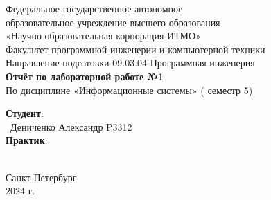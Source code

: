 \documentclass{article}
\begin{document}
\begin{center}
    \Large
    Федеральное государственное автономное \\
    образовательное учреждение высшего образования \\ 
    «Научно-образовательная корпорация ИТМО»\\
    \vspace{0.5cm}
    \large
    Факультет программной инженерии и компьютерной техники \\
    Направление подготовки 09.03.04 Программная инженерия \\
    \vspace{1cm}
    \Large
    \textbf{Отчёт по лабораторной работе №1} \\
    По дисциплине «Информационные системы» ( семестр 5)\\
    \large
    \vspace{8cm}

    \begin{minipage}{.33\textwidth}
    \end{minipage}
    \hfill
    \begin{minipage}{.4\textwidth}
    
        \textbf{Студент}: \vspace{.1cm} \\
        \ Дениченко Александр P3312\\
        \textbf{Практик}:  \\
        \ 
    \end{minipage}
    \vfill
Санкт-Петербург\\ 2024 г.
\end{center}
\pagestyle{empty}
\newpage
\pagestyle{plain}
\end{document}
